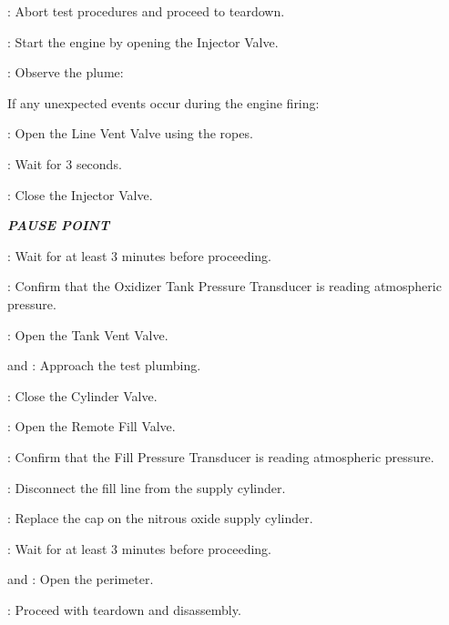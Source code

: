 \begin{checklist}
\begin{checklist}
\begin{checklist}[label=$\bullet$]
\begin{checklist}
                \item \ops: Abort test procedures and proceed to teardown.
            \end{checklist}
        \end{checklist}
    \end{checklist}
    \item \primary: Start the engine by opening the Injector Valve.
    \item \primary: Observe the plume:
    \begin{checklist}[label=$\bullet$]
        \item If any unexpected events occur during the engine firing:
        \begin{checklist}
            \item \primary{}: Open the Line Vent Valve using the ropes.
            \item \primary{}: Wait for 3 seconds.
            \item \primary{}: Close the Injector Valve.
        \end{checklist}
    \end{checklist}
    \item \textbf{\textit{PAUSE POINT}}
    \item \ops{}: Wait for at least 3 minutes before proceeding.
    \item \daq{}: Confirm that the Oxidizer Tank Pressure Transducer is reading atmospheric pressure.
    \item \primary{}: Open the Tank Vent Valve.
    \item \primary{} and \secondary: Approach the test plumbing.
    \item \primary{}: Close the Cylinder Valve.
    \item \primary{}: Open the Remote Fill Valve.
    \item \daq{}: Confirm that the Fill Pressure Transducer is reading atmospheric pressure.
    \item \primary{}: Disconnect the fill line from the supply cylinder.
    \item \primary{}: Replace the cap on the nitrous oxide supply cylinder.
    \item \ops{}: Wait for at least 3 minutes before proceeding.
    \item \peri{} and \perii{}: Open the perimeter.
    \item \ops{}: Proceed with teardown and disassembly.

\end{checklist}
\setcounter{checklistnum}{0}

